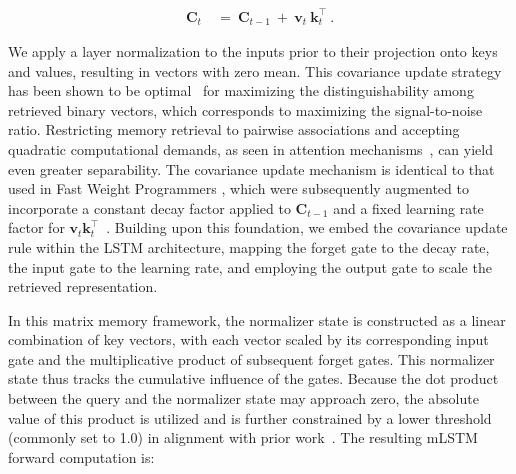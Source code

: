 \begin{align}
\mathbf{C}_t \ &= \ \mathbf{C}_{t-1} \ + \ \mathbf{v}_{t} \ \mathbf{k}_t^\top \ .
\end{align}

We apply a layer normalization to the inputs prior to their projection onto keys and values, resulting in vectors with zero mean. This covariance update strategy has been shown to be optimal~\citep{Dayan:91} for maximizing the distinguishability among retrieved binary vectors, which corresponds to maximizing the signal-to-noise ratio. Restricting memory retrieval to pairwise associations and accepting quadratic computational demands, as seen in attention mechanisms~\citep{Krotov:16,Krotov:17,Ramsauer:21}, can yield even greater separability. The covariance update mechanism is identical to that used in Fast Weight Programmers \citep{Schmidhuber:92ncfastweights,Schlag:21}, which were subsequently augmented to incorporate a constant decay factor applied to $\mathbf{C}_{t-1}$ and a fixed learning rate factor for 
$\mathbf{v}_{t} \mathbf{k}_t ^\top$~\citep{Ba:16}. Building upon this foundation, we embed the covariance update rule within the LSTM architecture, mapping the forget gate to the decay rate, the input gate to the learning rate, and employing the output gate to scale the retrieved representation.

In this matrix memory framework, the normalizer state is constructed as a linear combination of key vectors, with each vector scaled by its corresponding input gate and the multiplicative product of subsequent forget gates. This normalizer state thus tracks the cumulative influence of the gates. Because the dot product between the query and the normalizer state may approach zero, the absolute value of this product is utilized and is further constrained by a lower threshold (commonly set to 1.0) in alignment with prior work~\citep{Sun:23arxiv}. The resulting mLSTM forward computation is:

